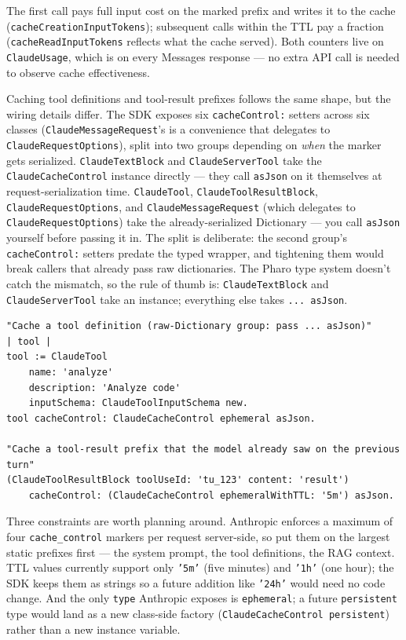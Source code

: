 \documentclass[a4paper,10pt,fleqn]{article}
\begin{document}
\begin{sloppypar}
The first call pays full input cost on the marked prefix and
writes it to the cache (\texttt{cacheCreationInputTokens});
subsequent calls within the TTL pay a fraction
(\texttt{cacheReadInputTokens} reflects what the cache served).
Both counters live on \texttt{ClaudeUsage}, which is on every
Messages response --- no extra API call is needed to observe
cache effectiveness.
\end{sloppypar}

Caching tool definitions and tool-result prefixes follows the
same shape, but the wiring details differ.  The SDK exposes six
\texttt{cacheControl:} setters across six classes
(\texttt{ClaudeMessageRequest}'s is a convenience that delegates to
\texttt{ClaudeRequestOptions}), split into two groups depending on
\emph{when} the marker gets serialized.  \texttt{ClaudeTextBlock}
and \texttt{ClaudeServerTool} take the \texttt{ClaudeCacheControl}
instance directly --- they call \texttt{asJson} on it themselves at
request-serialization time.  \texttt{ClaudeTool},
\texttt{ClaudeToolResultBlock}, \texttt{ClaudeRequestOptions}, and
\texttt{ClaudeMessageRequest} (which delegates to
\texttt{ClaudeRequestOptions}) take the already-serialized
Dictionary --- you call \texttt{asJson} yourself before passing it
in.  The split is deliberate: the
second group's \texttt{cacheControl:} setters predate the typed
wrapper, and tightening them would break callers that already
pass raw dictionaries.  The Pharo type system doesn't catch the
mismatch, so the rule of thumb is: \texttt{ClaudeTextBlock} and
\texttt{ClaudeServerTool} take an instance; everything else takes
\texttt{... asJson}.

\begin{lstlisting}[language={}]
"Cache a tool definition (raw-Dictionary group: pass ... asJson)"
| tool |
tool := ClaudeTool
    name: 'analyze'
    description: 'Analyze code'
    inputSchema: ClaudeToolInputSchema new.
tool cacheControl: ClaudeCacheControl ephemeral asJson.

"Cache a tool-result prefix that the model already saw on the previous turn"
(ClaudeToolResultBlock toolUseId: 'tu_123' content: 'result')
    cacheControl: (ClaudeCacheControl ephemeralWithTTL: '5m') asJson.
\end{lstlisting}

Three constraints are worth planning around.  Anthropic enforces
a maximum of four \texttt{cache\_control} markers per request
server-side, so put them on the largest static prefixes first ---
the system prompt, the tool definitions, the RAG context.  TTL
values currently support only \texttt{'5m'} (five minutes) and
\texttt{'1h'} (one hour); the SDK keeps them as strings so a
future addition like \texttt{'24h'} would need no code change.
And the only \texttt{type} Anthropic exposes is
\texttt{ephemeral}; a future \texttt{persistent} type would land
as a new class-side factory
(\texttt{ClaudeCacheControl persistent}) rather than a new
instance variable.
\end{document}
